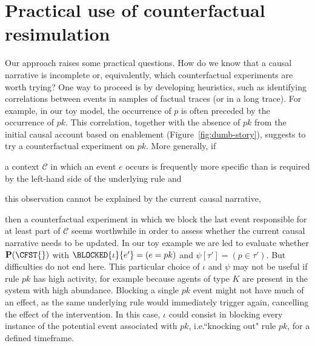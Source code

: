 \section{Practical use of counterfactual resimulation}
\label{sec:cosim-practice}

Our approach raises some practical questions. How do we know that a
causal narrative is incomplete or, equivalently, which counterfactual
experiments are worth trying? One way to proceed is by developing
heuristics, such as identifying correlations between events in samples
of factual traces (or in a long trace). For example, in our toy model,
the occurrence of $p$ is often preceded by the occurrence of
$pk$. This correlation, together with the absence of $pk$ from the
initial causal account based on enablement
(Figure~\ref{fig:dumb-story}), suggests to try a counterfactual
experiment on $pk$. More generally, if
\begin{inparaenum}[(i)]
\item a context $\mathcal C$ in which an event $e$ occurs is
  frequently more specific than is required by the left-hand side of
  the underlying rule and
\item this observation cannot be explained by the current causal
  narrative,
\end{inparaenum}
then a counterfactual experiment in which we block the last event
responsible for at least part of $\mathcal C$ seems worthwhile in
order to assess whether the current causal narrative needs to be
updated.  In our toy example we are led to evaluate whether
$\mathbf{P}(\CFST{})$ with $\BLOCKED{\iota}{e'} = (e = pk)$ and
$\psi[\tau'] = (p \in \tau')$. But difficulties do not end here. This
particular choice of $\iota$ and $\psi$ may not be useful if rule $pk$
has high activity, for example because agents of type $K$ are present
in the system with high abundance. Blocking a single $pk$ event might
not have much of an effect, as the same underlying rule would
immediately trigger again, cancelling the effect of the intervention.
In this case, $\iota$ could consist in blocking every instance of the
potential event associated with $pk$, i.e.\@ ``knocking out" rule
$pk$, for a defined timeframe.
